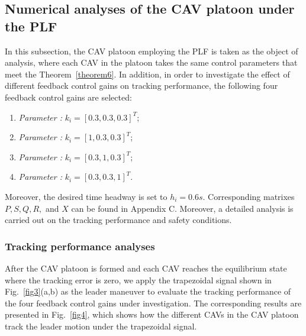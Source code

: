 \documentclass[a4paper]{cas-sc}
\begin{document}
\subsection{Numerical analyses of the CAV platoon under the PLF}
\label{Section 5.2}
In this subsection, the CAV platoon employing the PLF is taken as the object of analysis, where each CAV in the platoon takes the same control parameters that meet the Theorem~\ref{theorem6}. In addition, in order to investigate the effect of different feedback control gains on tracking performance, the following four feedback control gains are selected:
\begin{enumerate}
  \item \textit{Parameter \uppercase\expandafter{}:} $ {k_i} = {[0.3,0.3,0.3]^T} $;
  \item \textit{Parameter \uppercase\expandafter{}:} $ {k_i} = {[1,0.3,0.3]^T} $;
  \item \textit{Parameter \uppercase\expandafter{}:} $ {k_i} = {[0.3,1,0.3]^T} $;
  \item \textit{Parameter \uppercase\expandafter{}:} $ {k_i} = {[0.3,0.3,1]^T} $.
\end{enumerate}
Moreover, the desired time headway is set to $ {h_i} = 0.6s $. Corresponding matrixes $ P,S,Q,R, $ and $X$ can be found in Appendix C. Moreover, a detailed analysis is carried out on the tracking performance and safety conditions.

\subsubsection{Tracking performance analyses}
\label{Section 5.2.1}
After the CAV platoon is formed and each CAV reaches the equilibrium state where the tracking error is zero, we apply the trapezoidal signal shown in Fig.~\ref{fig3}(a,b) as the leader maneuver to evaluate the tracking performance of the four feedback control gains under investigation. The corresponding results are presented in Fig.~\ref{fig4}, which shows how the different CAVs in the CAV platoon track the leader motion under the trapezoidal signal.
\end{document}
